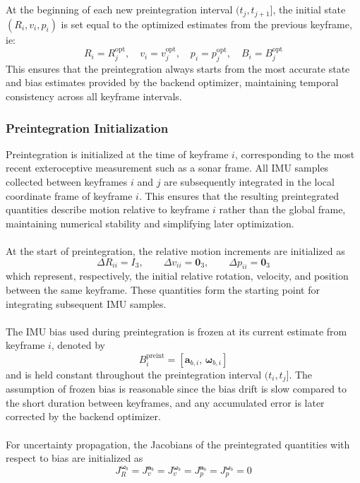 \\ \\
At the beginning of each new preintegration interval $(t_j, t_{j+1}]$, the initial state $(R_i, v_i, p_i)$ is set equal to the optimized estimates from the previous keyframe, ie:
$$
    R_i = R_j^{\text{opt}}, \quad v_i = v_j^{\text{opt}}, \quad p_i = p_j^{\text{opt}}, \quad B_i = B_j^{\text{opt}}
$$
This ensures that the preintegration always starts from the most accurate state and bias estimates provided by the backend optimizer, maintaining temporal consistency across all keyframe intervals.



\subsubsection{Preintegration Initialization}
Preintegration is initialized at the time of keyframe $i$, corresponding to the most recent exteroceptive measurement such as a sonar frame. All IMU samples collected between keyframes $i$ and $j$ are subsequently integrated in the local coordinate frame of keyframe $i$. This ensures that the resulting preintegrated quantities describe motion relative to keyframe $i$ rather than the global frame, maintaining numerical stability and simplifying later optimization.
\\ \\
At the start of preintegration, the relative motion increments are initialized as
$$
    \Delta R_{ii} = I_3, \qquad
    \Delta v_{ii} = \mathbf{0}_3, \qquad
    \Delta p_{ii} = \mathbf{0}_3
$$
which represent, respectively, the initial relative rotation, velocity, and position between the same keyframe. These quantities form the starting point for integrating subsequent IMU samples.
\\ \\
The IMU bias used during preintegration is frozen at its current estimate from keyframe $i$, denoted by
$$
    B_i^{\text{preint}} = [\mathbf{a}_{b,i},\, \mathbf{\omega}_{b,i}]
$$
and is held constant throughout the preintegration interval $(t_i, t_j]$. The assumption of frozen bias is reasonable since the bias drift is slow compared to the short duration between keyframes, and any accumulated error is later corrected by the backend optimizer.
\\ \\
For uncertainty propagation, the Jacobians of the preintegrated quantities with respect to bias are initialized as
$$
    J_R^{\boldsymbol{\omega}_b} = J_v^{\mathbf{a}_b} = J_v^{\boldsymbol{\omega}_b} = J_p^{\mathbf{a}_b} = J_p^{\boldsymbol{\omega}_b} = 0
$$
